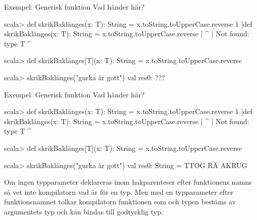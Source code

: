 \begin{Slide}{Exempel: Generisk funktion}
Vad händer här?
\begin{REPL}

scala> def skrikBaklänges(x: T): String = x.toString.toUpperCase.reverse
1 |def skrikBaklänges(x: T): String = x.toString.toUpperCase.reverse
  |                      ^
  |                      Not found: type T
                             ^

scala> def skrikBaklänges[T](x: T): String = x.toString.toUpperCase.reverse

scala> skrikBaklänges("gurka är gott")
val res0: ???
\end{REPL}
\end{Slide}
\fi

\begin{Slide}{Exempel: Generisk funktion}
Vad händer här?
\begin{REPL}

scala> def skrikBaklänges(x: T): String = x.toString.toUpperCase.reverse
1 |def skrikBaklänges(x: T): String = x.toString.toUpperCase.reverse
  |                      ^
  |                      Not found: type T
                             ^

scala> def skrikBaklänges[T](x: T): String = x.toString.toUpperCase.reverse

scala> skrikBaklänges("gurka är gott")
val res0: String = TTOG RÄ AKRUG
\end{REPL}
Om ingen typparameter deklareras inom hakparenteser efter funktionens namns så vet inte kompilatorn vad  är för en typ. Men med en typparameter \code{[T]} efter funktionsnamnet tolkar kompilatorn funktionen som  och typen  bestäms av argumentets typ  och  kan bindas till godtycklig typ.
\end{Slide}


